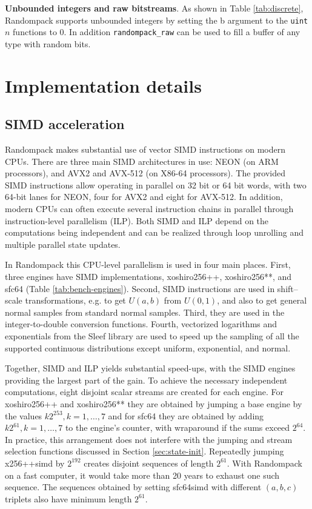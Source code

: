 \documentclass[manuscript,screen,review]{acmart}
\begin{document}
\textbf{Unbounded integers and raw bitstreams}. As shown in Table
\ref{tab:discrete}, Randompack supports unbounded integers by setting
the b argument to the \texttt{uint}$n$ functions to 0. In addition
\texttt{randompack\_raw} can be used to fill a buffer of any type with
random bits.

\section{Implementation details}

\subsection{SIMD acceleration}
Randompack makes substantial use of vector SIMD instructions on modern
CPUs. There are three main SIMD architectures in use: NEON (on ARM
processors), and AVX2 and AVX-512 (on X86-64 processors). The provided
SIMD instructions allow operating in parallel on 32 bit or 64 bit
words, with two 64-bit lanes for NEON, four for AVX2 and eight for
AVX-512. In addition, modern CPUs can often execute several
instruction chains in parallel through instruction-level parallelism
(ILP). Both SIMD and ILP depend on the computations being independent
and can be realized through loop unrolling and multiple parallel state
updates.

In Randompack this CPU-level parallelism is used in four main places.
First, three engines have SIMD implementations, xoshiro256++,
xoshiro256**, and sfc64 (Table \ref{tab:bench-engines}). Second, SIMD
instructions are used in shift--scale transformations, e.g. to get
$U(a,b)$ from $U(0,1)$, and also to get general normal samples from
standard normal samples. Third, they are used in the integer-to-double
conversion functions. Fourth, vectorized logarithms and exponentials
from the Sleef library \cite{sleef_github,shibata2020sleef} are used
to speed up the sampling of all the supported continuous distributions
except uniform, exponential, and normal.

Together, SIMD and ILP yields substantial speed-ups, with the SIMD
engines providing the largest part of the gain. To achieve the
necessary independent computations, eight disjoint scalar streams are
created for each engine. For xoshiro256++ and xoshiro256** they are
obtained by jumping a base engine by the values $k2^{253},
k=1,\ldots,7$ and for sfc64 they are obtained by adding $k2^{61},
k=1,\ldots,7$ to the engine's counter, with wraparound if the sums
exceed $2^{64}$. In practice, this arrangement does not interfere with
the jumping and stream selection functions discussed in Section
\ref{sec:state-init}. Repeatedly jumping x256++simd by $2^{192}$
creates disjoint sequences of length $2^{61}$. With Randompack on a
fast computer, it would take more than 20 years to exhaust one such
sequence. The sequences obtained by setting sfc64simd with different
$(a,b,c)$ triplets also have minimum length $2^{61}$.
\end{document}
